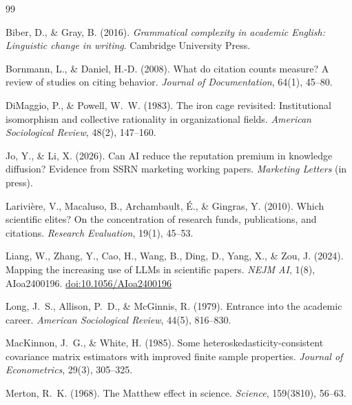 \documentclass[12pt,a4paper]{article}
\newcommand{\doi}[1]{\href{https://doi.org/#1}{doi:#1}}
\begin{document}

\begin{thebibliography}{99}

Biber, D., \& Gray, B. (2016).
\newblock \textit{Grammatical complexity in academic English: Linguistic change
  in writing}.
\newblock Cambridge University Press.

Bornmann, L., \& Daniel, H.-D. (2008).
\newblock What do citation counts measure? A review of studies on citing
  behavior.
\newblock \textit{Journal of Documentation}, 64(1), 45--80.

DiMaggio, P., \& Powell, W.~W. (1983).
\newblock The iron cage revisited: Institutional isomorphism and collective
  rationality in organizational fields.
\newblock \textit{American Sociological Review}, 48(2), 147--160.

Jo, Y., \& Li, X. (2026).
\newblock Can AI reduce the reputation premium in knowledge diffusion?
  Evidence from SSRN marketing working papers.
\newblock \textit{Marketing Letters} (in press).

Larivière, V., Macaluso, B., Archambault, É., \& Gingras, Y. (2010).
\newblock Which scientific elites? On the concentration of research funds,
  publications, and citations.
\newblock \textit{Research Evaluation}, 19(1), 45--53.

Liang, W., Zhang, Y., Cao, H., Wang, B., Ding, D., Yang, X.,
  \& Zou, J. (2024).
\newblock Mapping the increasing use of LLMs in scientific papers.
\newblock \textit{NEJM AI}, 1(8), AIoa2400196.
\newblock \doi{10.1056/AIoa2400196}

Long, J.~S., Allison, P.~D., \& McGinnis, R. (1979).
\newblock Entrance into the academic career.
\newblock \textit{American Sociological Review}, 44(5), 816--830.

MacKinnon, J.~G., \& White, H. (1985).
\newblock Some heteroskedasticity-consistent covariance matrix estimators with
  improved finite sample properties.
\newblock \textit{Journal of Econometrics}, 29(3), 305--325.

Merton, R.~K. (1968).
\newblock The Matthew effect in science.
\newblock \textit{Science}, 159(3810), 56--63.


\end{thebibliography}
\end{document}
